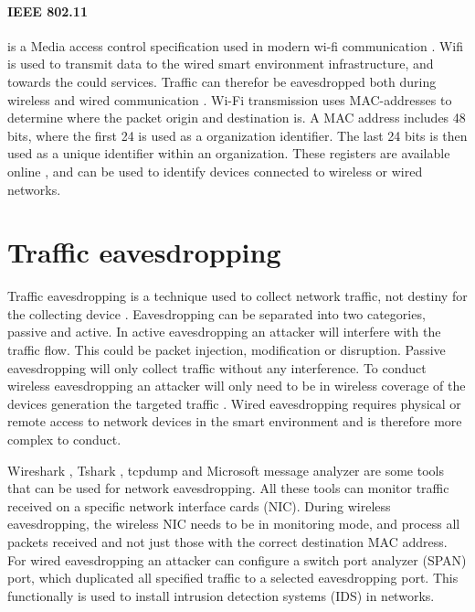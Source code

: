 \paragraph{IEEE 802.11} is a Media access control specification used in modern wi-fi communication \cite{wifi_ieee80211}. Wifi is used to transmit data to the wired smart environment infrastructure, and towards the could services. Traffic can therefor be eavesdropped both during wireless and wired communication \cite{eavesdroppingwifi}. Wi-Fi transmission uses MAC-addresses \cite{macaddress} to determine where the packet origin and destination is. A MAC address includes 48 bits, where the first 24 is used as a organization identifier. The last 24 bits is then used as a unique identifier within an organization. These registers are available online \cite{mac_address_lookup}, and can be used to identify devices connected to wireless or wired networks. 

\section{Traffic eavesdropping}
Traffic eavesdropping is a technique used to collect network traffic, not destiny for the collecting device \cite{eavsdropping_fortinet}. Eavesdropping can be separated into two categories, passive and active. In active eavesdropping an attacker will interfere with the traffic flow. This could be packet injection, modification or disruption. Passive eavesdropping will only collect traffic without any interference. To conduct wireless eavesdropping an attacker will only need to be in wireless coverage of the devices generation the targeted traffic \cite{eavesdroppingwifi}. Wired eavesdropping requires physical or remote access to network devices in the smart environment and is therefore more complex to conduct. 

Wireshark \cite{wireshark}, Tshark \cite{wireshark}, tcpdump \cite{tcpdump} and Microsoft message analyzer \cite{microsoftmessageanalyzer} are some tools that can be used for network eavesdropping. All these tools can monitor traffic received on a specific network interface cards (NIC). During wireless eavesdropping, the wireless NIC needs to be in monitoring mode, and process all packets received and not just those with the correct destination MAC address. For wired eavesdropping an attacker can configure a switch port analyzer (SPAN) port, which duplicated all specified traffic to a selected eavesdropping port. This functionally is used to install intrusion detection systems (IDS) in networks. 

